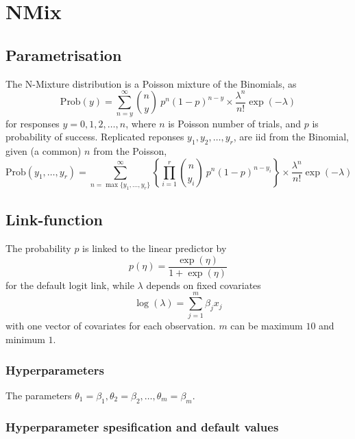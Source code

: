 \documentclass[a4paper,11pt]{article}
\def\mmax{10}
\begin{document}
\section*{NMix}

\subsection*{Parametrisation}

The N-Mixture distribution is a Poisson mixture of the Binomials, as
\begin{displaymath}
    \text{Prob}(y) = \sum_{n=y}^{\infty} {n \choose y} \ p^n
    (1-p)^{n-y} \times \frac{\lambda^{n}}{n!}\exp(-\lambda)
\end{displaymath}
for responses $y=0, 1, 2, \ldots,n$, where $n$ is Poisson number of
trials, and $p$ is probability of success. Replicated reponses
$y_1, y_2, \ldots, y_r$, are iid from the Binomial, given (a common)
$n$ from the Poisson,
\begin{displaymath}
    \text{Prob}(y_1, \ldots, y_r) = \sum_{n=\max\{y_1, \ldots,
        y_r\}}^{\infty} \left\{\prod_{i=1}^{r}
    {n \choose y_i} \ p^n
    (1-p)^{n-y_i}\right\} \times \frac{\lambda^{n}}{n!}\exp(-\lambda)
\end{displaymath}

\subsection*{Link-function}

The probability $p$ is linked to the linear predictor by
\begin{displaymath}
    p(\eta) = \frac{\exp(\eta)}{1+\exp(\eta)}
\end{displaymath}
for the default logit link, while $\lambda$ depends on fixed
covariates
\begin{displaymath}
    \log(\lambda) = \sum_{j=1}^{m} \beta_j x_j
\end{displaymath}
with one vector of covariates for each observation. $m$ can be maximum
$\mmax$ and minimum $1$.

\subsubsection*{Hyperparameters}
The parameters
$\theta_1=\beta_1, \theta_2=\beta_2, \ldots, \theta_m=\beta_m$.

\subsubsection*{Hyperparameter spesification and default values}

\end{document}
